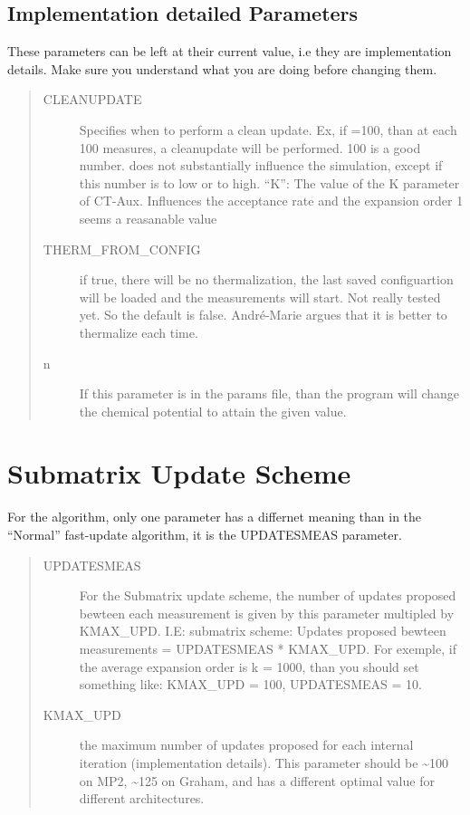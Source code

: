 \documentclass[letterpaper,10pt,english]{sphinxmanual}
\begin{document}
\subsection{Implementation detailed Parameters}
\label{\detokenize{params:implementation-detailed-parameters}}
These parameters can be left at their current value, i.e they are implementation details.
Make sure you understand what you are doing before changing them.
\begin{quote}
\begin{description}
\item[{CLEANUPDATE}] \leavevmode
Specifies when to perform a clean update. Ex, if =100, than at each
100 measures, a cleanupdate will be performed. 100 is a good number.
does not substantially influence the simulation, except if this number is to low or to high.
``K'': The value of the K parameter of CT-Aux. Influences the acceptance rate and the expansion order
1 seems a reasanable value

\item[{THERM\_FROM\_CONFIG}] \leavevmode
if true, there will be no thermalization, the last saved configuartion will be loaded
and the measurements will start. Not really tested yet. So the default is false.
André-Marie argues that it is better to thermalize each time.

\item[{n}] \leavevmode
If this parameter is in the params file, than the program will change the chemical potential to attain the given value.

\end{description}
\end{quote}


\section{Submatrix Update Scheme}
\label{\detokenize{params:submatrix-update-scheme}}
For the  algorithm, only one parameter has a differnet meaning than in the ``Normal'' fast-update algorithm, it is the UPDATESMEAS
parameter.
\begin{quote}
\begin{description}
\item[{UPDATESMEAS}] \leavevmode
For the Submatrix update scheme, the number of updates proposed
bewteen each measurement is given by this parameter multipled by KMAX\_UPD. I.E:
submatrix scheme: Updates proposed bewteen measurements = UPDATESMEAS * KMAX\_UPD.
For exemple, if the average expansion order is k = 1000, than you should set something like:
KMAX\_UPD = 100, UPDATESMEAS = 10.

\item[{KMAX\_UPD}] \leavevmode
the maximum number of updates proposed for each internal iteration (implementation details).
This parameter should be \textasciitilde{}100 on MP2, \textasciitilde{}125 on Graham, and has a different optimal value for different architectures.

\end{description}
\end{quote}



\renewcommand{\indexname}{Index}
\printindex
\end{document}
